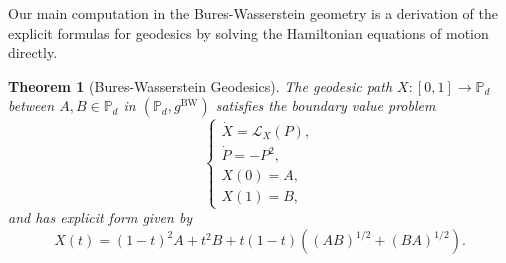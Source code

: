 \documentclass{amsart}
\newtheorem{theorem}{Theorem}[section]
\theoremstyle{definition}
\theoremstyle{remark}
\numberwithin{equation}{section}
\begin{document}
Our main computation in the Bures-Wasserstein geometry is a derivation of the explicit formulas for geodesics by solving the Hamiltonian equations of motion directly. 
\begin{theorem}[Bures-Wasserstein Geodesics]\label{thm:bw_general_case}
    The geodesic path $X: [0,1] \to \mathbb{P}_d$ between $A, B \in \mathbb{P}_d$ in $(\mathbb{P}_d, g^\text{BW})$ satisfies the boundary value problem
    \begin{equation}\label{eq:bures_wasserstein_equations}
        \begin{cases}
            \dot{X} = \mathcal{L}_X(P), \\
            \dot{P} = -P^2,\\
            X(0) = A,\\
            X(1) = B,
        \end{cases}
    \end{equation}
    and has explicit form given by
\begin{equation}
    X(t) = (1-t)^2 A + t^2 B + t(1-t)\left((AB)^{1/2} + (BA)^{1/2}\right).
\end{equation}
\end{theorem}
\end{document}
